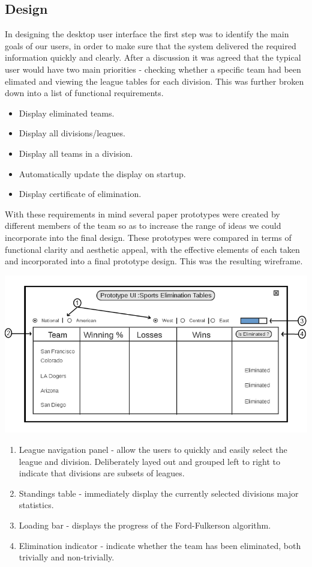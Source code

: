 \subsection{Design}
In designing the desktop user interface the first step was to identify the
main goals of our users, in order to make sure that the system delivered
the required information quickly and clearly. After a discussion it was 
agreed that the typical user would have two main priorities - checking 
whether a specific team had been elimated and viewing the league tables for
each division. This was further broken down into a list of functional requirements.

\begin{itemize}
\item Display eliminated teams.
\item Display all divisions/leagues.
\item Display all teams in a division.
\item Automatically update the display on startup.
\item Display certificate of elimination.
\end{itemize}

With these requirements in mind several paper prototypes were
created by different members of the team so as to increase the range of
ideas we could incorporate into the final design. These prototypes were
compared in terms of functional clarity and aesthetic appeal, with the 
effective elements of each taken and incorporated into a final prototype
design. This was the resulting wireframe.

\includegraphics[width=\linewidth,keepaspectratio]
{images/Prototype_UI.png}

\begin{enumerate}
\item League navigation panel - allow the users to quickly and easily select the
league and division. Deliberately layed out and grouped left to right to indicate
that divisions are subsets of leagues.
\item Standings table - immediately display the currently selected divisions major 
statistics.
\item Loading bar - displays the progress of the Ford-Fulkerson algorithm.
\item Elimination indicator - indicate whether the team has been eliminated, both
trivially and non-trivially.
\end{enumerate}


